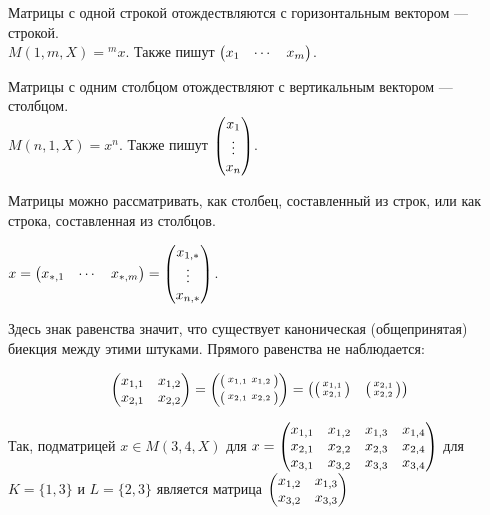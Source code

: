 \documentclass[a4paper]{report}
\begin{document}
    Матрицы с одной строкой отождествляются с горизонтальным вектором --- строкой. \\ $M(1, m, X) = {}^m x$.
    Также пишут $\begin{pmatrix}x_1 & \cdots & x_m\end{pmatrix}$.

    Матрицы с одним столбцом отождествляют с вертикальным вектором --- столбцом. \\ $M(n, 1, X) = x^n$.
    Также пишут $\begin{pmatrix}x_1 \\ \vdots \\ x_n\end{pmatrix}$.


    Матрицы можно рассматривать, как столбец, составленный из строк, или как строка, составленная из столбцов.

    $x = \begin{pmatrix}x_{*,1} & \cdots & x_{*,m}\end{pmatrix} = \begin{pmatrix}x_{1,*} \\ \vdots \\ x_{n,*}\end{pmatrix}$.

    Здесь знак равенства значит, что существует каноническая (общепринятая) биекция между этими штуками.
    Прямого равенства не наблюдается:

    \[\begin{pmatrix}x_{1,1}&x_{1,2}\\x_{2,1}&x_{2,2}\end{pmatrix} = \begin{pmatrix}\begin{psmallmatrix}x_{1,1} & x_{1, 2}\end{psmallmatrix}\\ \begin{psmallmatrix}x_{2, 1} & x_{2,2}\end{psmallmatrix}\end{pmatrix} = \begin{pmatrix}\begin{psmallmatrix}x_{1,1}\\x_{2,1}\end{psmallmatrix} & \begin{psmallmatrix}x_{2,1} \\ x_{2,2}\end{psmallmatrix}\end{pmatrix}\]

    Так, подматрицей $x \in M(3, 4, X)$ для $x = \begin{pmatrix}
        x_{1,1} & x_{1, 2} & x_{1, 3} & x_{1, 4} \\
        x_{2,1} & x_{2, 2} & x_{2, 3} & x_{2, 4} \\
        x_{3,1} & x_{3, 2} & x_{3, 3} & x_{3, 4} \end{pmatrix}$
    для $K = \{1, 3\}$ и $L = \{2, 3\}$ является матрица $\begin{pmatrix}x_{1,2} & x_{1, 3} \\ x_{3, 2} & x_{3, 3}\end{pmatrix}$
\end{document}
